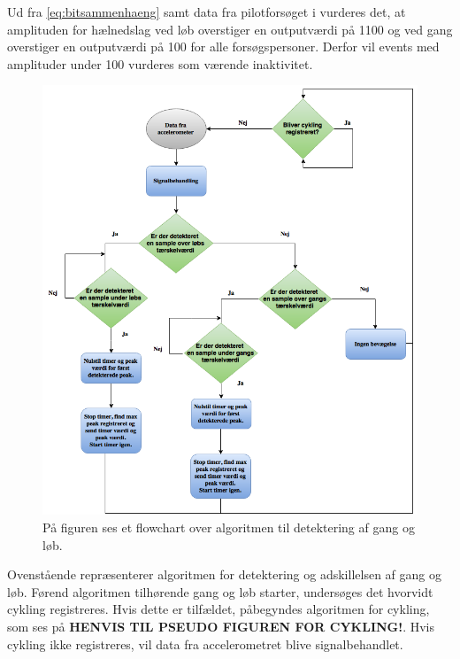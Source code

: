 Ud fra \eqref{eq:bitsammenhaeng} samt data fra pilotforsøget i  vurderes det, at amplituden for hælnedslag ved løb overstiger en outputværdi på 1100 og ved gang overstiger en outputværdi på 100 for alle forsøgspersoner. Derfor vil events med amplituder under 100 vurderes som værende inaktivitet.
\begin{figure}[H]
	\centering
	\includegraphics[scale=0.5]{figures/cDesign/algoritme_gl.png}
	\caption{På figuren ses et flowchart over algoritmen til detektering af gang og løb.}
	\label{fig:algoritme}
\end{figure}
Ovenstående  repræsenterer algoritmen for detektering og adskillelsen af gang og løb. Førend algoritmen tilhørende gang og løb starter, undersøges det hvorvidt cykling registreres. Hvis dette er tilfældet, påbegyndes algoritmen for cykling, som ses på \textbf{HENVIS TIL PSEUDO FIGUREN FOR CYKLING!}. Hvis cykling ikke registreres, vil data fra accelerometret blive signalbehandlet. \\
